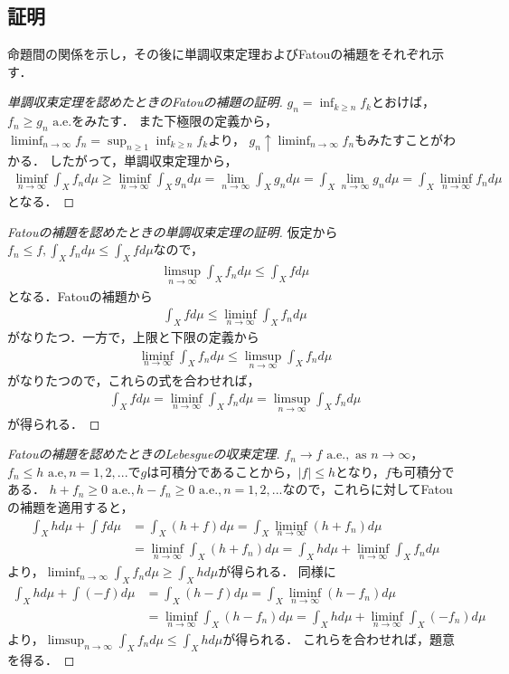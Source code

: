 \documentclass[a4paper,10pt]{jsarticle}
\theoremstyle{definition}
\newcommand{\eq}[1]{\begin{align}#1\end{align}}
\begin{document}
\subsection*{証明}
命題間の関係を示し，その後に単調収束定理およびFatouの補題をそれぞれ示す．
\begin{proof}[単調収束定理を認めたときのFatouの補題の証明]
$g_n=\inf_{k\ge n}f_k$とおけば，$f_n\ge g_n\text{ a.e.}$をみたす．
また下極限の定義から，$\displaystyle \liminf_{n\rightarrow\infty}f_n=\sup_{n\ge1}\inf_{k\ge n}f_k$より，
$\displaystyle g_n\uparrow\liminf_{n\rightarrow\infty}f_n$もみたすことがわかる．
したがって，単調収束定理から，
\eq{
	\liminf_{n\rightarrow\infty}\int_Xf_nd\mu\ge\liminf_{n\rightarrow\infty}\int_Xg_nd\mu=\lim_{n\rightarrow\infty}\int_Xg_nd\mu
	=\int_X\lim_{n\rightarrow\infty}g_nd\mu=\int_X\liminf_{n\rightarrow\infty}f_nd\mu}
となる．
\end{proof}
\begin{proof}[Fatouの補題を認めたときの単調収束定理の証明]
仮定から$f_n\le f,\int_Xf_nd\mu\le\int_Xfd\mu$なので，
\eq{\limsup_{n\rightarrow\infty}\int_Xf_nd\mu\le\int_Xfd\mu}
となる．Fatouの補題から
\eq{\int_Xfd\mu\le\liminf_{n\rightarrow\infty}\int_Xf_nd\mu}
がなりたつ．一方で，上限と下限の定義から
\eq{\liminf_{n\rightarrow\infty}\int_Xf_nd\mu\le\limsup_{n\rightarrow\infty}\int_Xf_nd\mu}
がなりたつので，これらの式を合わせれば，
\eq{\int_Xfd\mu=\liminf_{n\rightarrow\infty}\int_Xf_nd\mu=\limsup_{n\rightarrow\infty}\int_Xf_nd\mu}
が得られる．
\end{proof}
\begin{proof}[Fatouの補題を認めたときのLebesgueの収束定理]
$f_n\rightarrow f\text{ a.e.},\text{ as }n\rightarrow\infty$，$f_n\le h\text{ a.e},n=1,2,...$で$g$は可積分であることから，$|f|\le h$となり，$f$も可積分である．
$h+f_n\ge0\text{ a.e.},h-f_n\ge0\text{ a.e.},n=1,2,...$なので，これらに対してFatouの補題を適用すると，
\eq{	\int_Xhd\mu+\int fd\mu&=\int_X(h+f)d\mu=\int_X\liminf_{n\rightarrow\infty}(h+f_n)d\mu\\&=\liminf_{n\rightarrow\infty}\int_X(h+f_n)d\mu=\int_Xhd\mu+\liminf_{n\rightarrow\infty}\int_Xf_nd\mu}
より，$\displaystyle \liminf_{n\rightarrow\infty}\int_Xf_nd\mu\ge\int_Xhd\mu$が得られる．
同様に
\eq{	\int_Xhd\mu+\int(-f)d\mu&=\int_X(h-f)d\mu=\int_X\liminf_{n\rightarrow\infty}(h-f_n)d\mu\\&=\liminf_{n\rightarrow\infty}\int_X(h-f_n)d\mu=\int_Xhd\mu+\liminf_{n\rightarrow\infty}\int_X(-f_n)d\mu}
より，$\displaystyle \limsup_{n\rightarrow\infty}\int_Xf_nd\mu\le\int_Xhd\mu$が得られる．
これらを合わせれば，題意を得る．
\end{proof}
\end{document}
